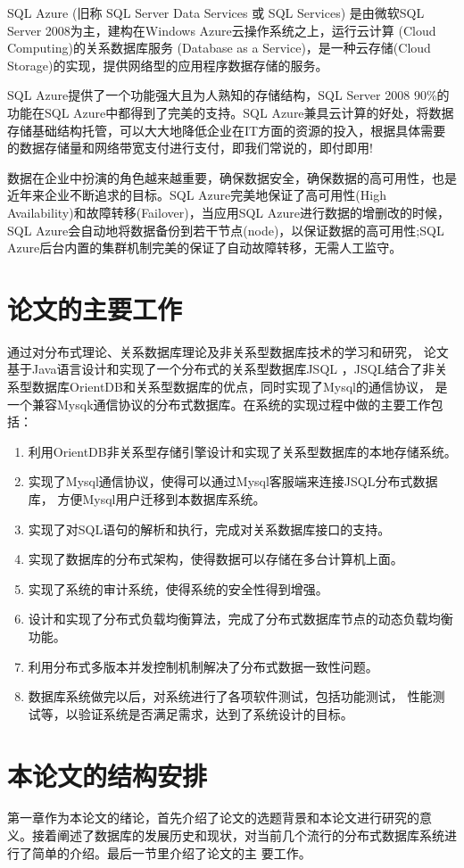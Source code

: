 	
	SQL Azure (旧称 SQL Server Data Services 或 SQL Services) 是由微软SQL Server 2008为主，建构在Windows Azure云操作系统之上，运行云计算 (Cloud Computing)的关系数据库服务 (Database as a Service)，是一种云存储(Cloud Storage)的实现，提供网络型的应用程序数据存储的服务。
	
	SQL Azure提供了一个功能强大且为人熟知的存储结构，SQL Server 2008 90\%的功能在SQL Azure中都得到了完美的支持。SQL Azure兼具云计算的好处，将数据存储基础结构托管，可以大大地降低企业在IT方面的资源的投入，根据具体需要的数据存储量和网络带宽支付进行支付，即我们常说的，即付即用!
	
	数据在企业中扮演的角色越来越重要，确保数据安全，确保数据的高可用性，也是近年来企业不断追求的目标。SQL Azure完美地保证了高可用性(High Availability)和故障转移(Failover)，当应用SQL Azure进行数据的增删改的时候， SQL Azure会自动地将数据备份到若干节点(node)，以保证数据的高可用性;SQL Azure后台内置的集群机制完美的保证了自动故障转移，无需人工监守。
\section{论文的主要工作}
通过对分布式理论、关系数据库理论及非关系型数据库技术的学习和研究，
论文基于Java语言设计和实现了一个分布式的关系型数据库JSQL
，JSQL结合了非关系型数据库OrientDB和关系型数据库的优点，同时实现了Mysql的通信协议，
是一个兼容Mysqk通信协议的分布式数据库。在系统的实现过程中做的主要工作包括：
\begin{enumerate}[fullwidth,itemindent=2em]
	\item 利用OrientDB非关系型存储引擎设计和实现了关系型数据库的本地存储系统。
	\item 实现了Mysql通信协议，使得可以通过Mysql客服端来连接JSQL分布式数据库，
	方便Mysql用户迁移到本数据库系统。
	\item 实现了对SQL语句的解析和执行，完成对关系数据库接口的支持。
	\item 实现了数据库的分布式架构，使得数据可以存储在多台计算机上面。
	\item 实现了系统的审计系统，使得系统的安全性得到增强。
	\item 设计和实现了分布式负载均衡算法，完成了分布式数据库节点的动态负载均衡功能。
	\item 利用分布式多版本并发控制机制解决了分布式数据一致性问题。
	\item 数据库系统做完以后，对系统进行了各项软件测试，包括功能测试，
	性能测试等，以验证系统是否满足需求，达到了系统设计的目标。
\end{enumerate}
\section{本论文的结构安排}
第一章作为本论文的绪论，首先介绍了论文的选题背景和本论文进行研究的意
义。接着阐述了数据库的发展历史和现状，对当前几个流行的分布式数据库系统进行了简单的介绍。最后一节里介绍了论文的主
要工作。

